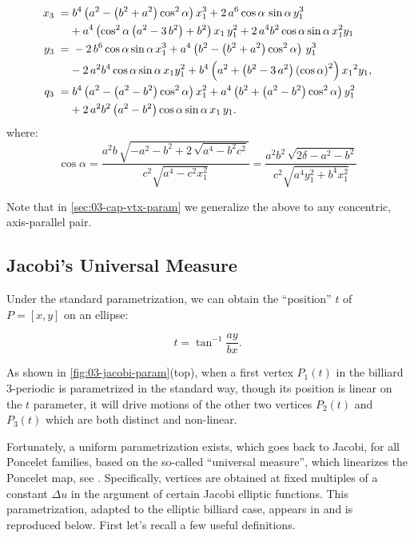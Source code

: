  \begin{equation} \label{eq:03-p3} \aligned 
x_{3}\; =& \; {b}^{4} \left( {a}^{2}- \left( {b}^{2}+{a}^{2} \right) 
 \cos^{2}\alpha\right)   x_1^{3}+2\, {a}^{6} 
 \cos \alpha\,\sin \alpha\, y_1^{3}\\
 &+{a}^{4} \left( 
  \cos^{2}  \alpha  \left( {a}^{2}-3\,{b}^{2}
 \right) +{b}^{2} \right) { x_1}\, y_1^{2}+2\,{a}^{4}{b}^{2} \cos  \alpha\sin \alpha\,   x_1^{2}{ y_1}
\\
y_{3} \;=&\; -2\, {b}^{6} \cos \alpha\sin \alpha\, x_1^{3}+
{a}^{4} \left( {b}^{2}- \left( {b}^{2}+{a}^{2} \right)   \cos^{2}  \alpha  \right)\,  y_1^{3}\\
& -2\,{a}^{2}  {b}^{4}\cos
 \alpha  \sin \alpha\,  x_1 y_1^{2}+
{b}^{4} \left( {a}^{2}+ \left( {b}^{2}-3\,{a}^{2} \right)  \left( \cos
 \alpha  \right) ^{2} \right) {{ x_1}}^{2}{ y_1},
\\
q_3 \;=& \; {b}^{4} \left( {a}^{2}- \left(a^2 -{b}^{2}  \right)   \cos^{2} \alpha   \right) x_1^{2}+{a}^{4} \left( {b}^{2}+ \left( a^2-{b}^{2}  \right)  \cos^{2} \alpha  \right)  y_1^{2}\\
&+2\,{a}^{2}{b}^{
2} \left( {a}^{2}-{b}^{2} \right) \cos \alpha \sin \alpha\, { x_1}\,{ y_1}.
\endaligned
%
\end{equation}
where:
\[\cos \alpha={\frac {a^2 b  \, \sqrt {-{a}^{2}-{b}^{2}+2\,\sqrt {{a}^{4}-{b}^{2}{c}^{2}}}}{{c}^{2}\sqrt {{a}^{4}-{c}^{2} x_1^{2}}}}=
\frac{  a^2 b^2 \, \sqrt {2\delta-{a}^{2}-{b}^{2}}} {c^2\sqrt{ a^4y_1^2 + b^4x_1^2}  } \]

Note that in \cref{sec:03-cap-vtx-param} we generalize the above to any concentric, axis-parallel pair.

\subsection{Jacobi's Universal Measure}
\label{sec:03-confocal-jacobi-param}

Under the standard parametrization, we can obtain the ``position'' $t$ of $P=[x,y]$ on an ellipse:

\[ t=\tan^{-1}{\frac{a y}{b x}}. \]

As shown in \cref{fig:03-jacobi-param}(top), when a first vertex $P_1(t)$ in the billiard 3-periodic is parametrized in the standard way, though its position is linear on the $t$ parameter, it will drive motions of the other two vertices $P_2(t)$ and $P_3(t)$ which are both distinct and non-linear. 

Fortunately, a uniform parametrization exists, which goes back to Jacobi, for all Poncelet families, based on the so-called ``universal measure'', which linearizes the Poncelet map, see \cite{koiller2021-spatial}. Specifically, vertices are obtained at fixed multiples of a constant $\Delta{u}$ in the argument of certain Jacobi elliptic functions. This parametrization, adapted to the elliptic billiard case, appears in \cite{stachel2021-billiards,stachel2021-billiards-param} and is reproduced below. First let's recall a few useful definitions. 

